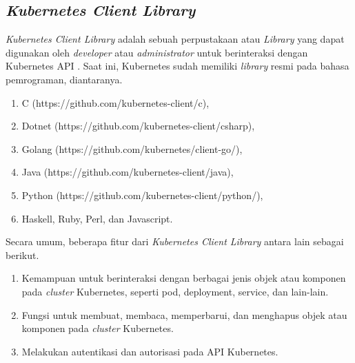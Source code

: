 \subsection{\textit{Kubernetes Client Library}}
\textit{Kubernetes Client Library} adalah sebuah perpustakaan atau \textit{Library} yang dapat digunakan oleh \textit{developer} atau \textit{administrator} untuk berinteraksi dengan Kubernetes API \parencite{clientlibrary}. Saat ini, Kubernetes sudah memiliki \textit{library} resmi pada bahasa pemrograman, diantaranya.

\begin{enumerate}
    \item C (https://github.com/kubernetes-client/c),
    \item Dotnet (https://github.com/kubernetes-client/csharp),
    \item Golang (https://github.com/kubernetes/client-go/),
    \item Java (https://github.com/kubernetes-client/java),
    \item Python (https://github.com/kubernetes-client/python/),
    \item Haskell, Ruby, Perl, dan Javascript.
\end{enumerate}

Secara umum, beberapa fitur dari \textit{Kubernetes Client Library} antara lain sebagai berikut.
\begin{enumerate}
    \item Kemampuan untuk berinteraksi dengan berbagai jenis objek atau komponen pada \textit{cluster} Kubernetes, seperti pod, deployment, service, dan lain-lain.
    \item Fungsi untuk membuat, membaca, memperbarui, dan menghapus objek atau komponen pada \textit{cluster} Kubernetes.
    \item Melakukan autentikasi dan autorisasi pada API Kubernetes.
\end{enumerate}